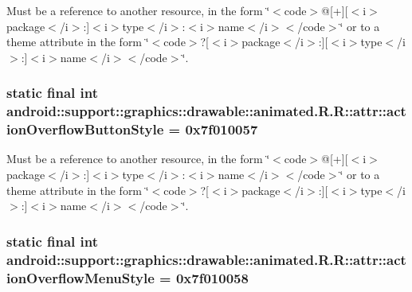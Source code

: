 Must be a reference to another resource, in the form \char`\"{}$<$code$>$@\mbox{[}+\mbox{]}\mbox{[}$<$i$>$package$<$/i$>$:\mbox{]}$<$i$>$type$<$/i$>$:$<$i$>$name$<$/i$>$$<$/code$>$\char`\"{} or to a theme attribute in the form \char`\"{}$<$code$>$?\mbox{[}$<$i$>$package$<$/i$>$:\mbox{]}\mbox{[}$<$i$>$type$<$/i$>$:\mbox{]}$<$i$>$name$<$/i$>$$<$/code$>$\char`\"{}. \hypertarget{classandroid_1_1support_1_1graphics_1_1drawable_1_1animated_1_1_r_1_1attr_342ae6b0ce500d3c1593df9ff1f986aa}{
\subsubsection[{actionOverflowButtonStyle}]{\setlength{\rightskip}{0pt plus 5cm}static final int android::support::graphics::drawable::animated.R.R::attr::actionOverflowButtonStyle = 0x7f010057}}
\label{classandroid_1_1support_1_1graphics_1_1drawable_1_1animated_1_1_r_1_1attr_342ae6b0ce500d3c1593df9ff1f986aa}


Must be a reference to another resource, in the form \char`\"{}$<$code$>$@\mbox{[}+\mbox{]}\mbox{[}$<$i$>$package$<$/i$>$:\mbox{]}$<$i$>$type$<$/i$>$:$<$i$>$name$<$/i$>$$<$/code$>$\char`\"{} or to a theme attribute in the form \char`\"{}$<$code$>$?\mbox{[}$<$i$>$package$<$/i$>$:\mbox{]}\mbox{[}$<$i$>$type$<$/i$>$:\mbox{]}$<$i$>$name$<$/i$>$$<$/code$>$\char`\"{}. \hypertarget{classandroid_1_1support_1_1graphics_1_1drawable_1_1animated_1_1_r_1_1attr_f2a1a45194053ab605ed493dde56fdc9}{
\subsubsection[{actionOverflowMenuStyle}]{\setlength{\rightskip}{0pt plus 5cm}static final int android::support::graphics::drawable::animated.R.R::attr::actionOverflowMenuStyle = 0x7f010058}}
\label{classandroid_1_1support_1_1graphics_1_1drawable_1_1animated_1_1_r_1_1attr_f2a1a45194053ab605ed493dde56fdc9}


